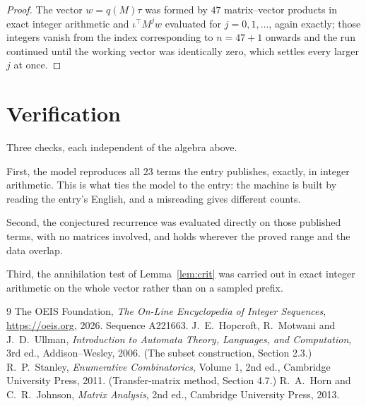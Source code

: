 \documentclass[11pt,a4paper]{article}
\theoremstyle{plain}
\theoremstyle{definition}
\begin{document}
\begin{proof}
The vector $w=q(M)\tau$ was formed by $47$ matrix--vector products in exact integer
arithmetic and $\iota^{\!\top}M^{j}w$ evaluated for $j=0,1,\dots$, again exactly; those
integers vanish from the index corresponding to $n=47+1$ onwards and the run continued
until the working vector was identically zero, which settles every larger $j$ at once.
\end{proof}

\section{Verification}

Three checks, each independent of the algebra above.

First, the model reproduces all $23$ terms the entry publishes, exactly, in integer
arithmetic. This is what ties the model to the entry: the machine is built by reading the
entry's English, and a misreading gives different counts.

Second, the conjectured recurrence was evaluated directly on those published terms, with no
matrices involved, and holds wherever the proved range and the data overlap.

Third, the annihilation test of Lemma~\ref{lem:crit} was carried out in exact integer
arithmetic on the whole vector rather than on a sampled prefix.

\begin{thebibliography}{9}
 The OEIS Foundation, \emph{The On-Line Encyclopedia of Integer
Sequences}, \url{https://oeis.org}, 2026. Sequence A221663.
 J.~E.~Hopcroft, R.~Motwani and J.~D.~Ullman, \emph{Introduction to Automata
Theory, Languages, and Computation}, 3rd ed., Addison--Wesley, 2006. (The subset
construction, Section 2.3.)
 R.~P.~Stanley, \emph{Enumerative Combinatorics}, Volume 1, 2nd ed.,
Cambridge University Press, 2011. (Transfer-matrix method, Section 4.7.)
 R.~A.~Horn and C.~R.~Johnson, \emph{Matrix Analysis}, 2nd ed., Cambridge
University Press, 2013.
\end{thebibliography}
\end{document}
